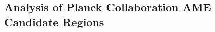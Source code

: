 \documentclass[preprint2,longabstract]{aastex}
\begin{document}
 
\subsection{Analysis of Planck Collaboration AME Candidate Regions}
\end{document}
